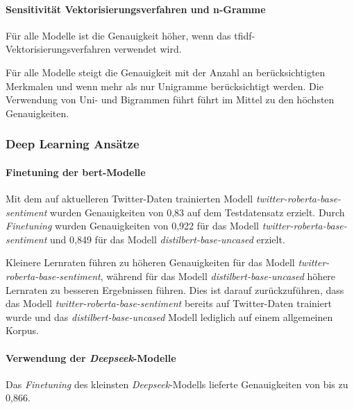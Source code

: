 \paragraph{Sensitivität Vektorisierungsverfahren und n-Gramme}

Für alle Modelle ist die Genauigkeit höher, wenn das \gls{tfidf}-Vektorisierungsverfahren verwendet wird.

Für alle Modelle steigt die Genauigkeit mit der Anzahl an berücksichtigten Merkmalen und wenn mehr als nur Unigramme berücksichtigt werden.
Die Verwendung von Uni- und Bigrammen führt führt im Mittel zu den höchsten Genauigkeiten.

\subsubsection{Deep Learning Ansätze}

\paragraph{Finetuning der \gls{bert}-Modelle}
Mit dem auf aktuelleren Twitter-Daten trainierten Modell \textit{twitter-roberta-base-sentiment} wurden Genauigkeiten von 0,83 auf dem Testdatensatz erzielt.
Durch \textit{Finetuning} wurden Genauigkeiten von 0,922 für das Modell \textit{twitter-roberta-base-sentiment} und 0,849 für das Modell \textit{distilbert-base-uncased} erzielt.

Kleinere Lernraten führen zu höheren Genauigkeiten für das Modell \textit{twitter-roberta-base-sentiment}, während für das Modell \textit{distilbert-base-uncased} höhere Lernraten zu besseren Ergebnissen führen.
Dies ist darauf zurückzuführen, dass das Modell \textit{twitter-roberta-base-sentiment} bereits auf Twitter-Daten trainiert wurde und das \textit{distilbert-base-uncased} Modell lediglich auf einem allgemeinen Korpus.

\paragraph{Verwendung der \textit{Deepseek}-Modelle}
Das \textit{Finetuning} des kleinsten \textit{Deepseek}-Modells lieferte Genauigkeiten von bis zu 0,866.

